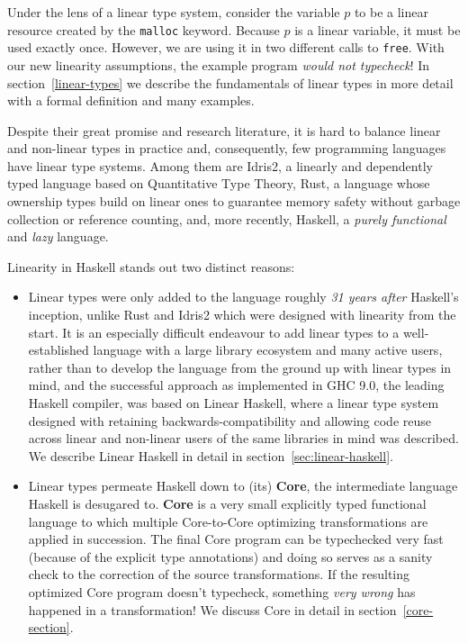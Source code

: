 \documentclass[]{lwnovathesis}
\begin{document}
Under the lens of a linear type system, consider the variable $p$ to be a linear
resource created by the \texttt{malloc} keyword. Because $p$ is a linear
variable, it must be used exactly once. However, we are using it in two
different calls to \texttt{free}. With our new linearity assumptions, the
example program \emph{would not typecheck}!  In section~\ref{linear-types} we describe the fundamentals of linear
types in more detail with a formal definition and many examples.

Despite their great promise and research literature, it is hard to balance
linear and non-linear types in practice and, consequently, few programming
languages have linear type systems. Among them are Idris2\cite{}, a linearly and
dependently typed language based on Quantitative Type Theory, Rust\cite{}, a
language whose ownership types build on linear ones to guarantee memory safety
without garbage collection or reference counting, and, more recently,
Haskell\cite{}, a \emph{purely functional} and \emph{lazy} language.

Linearity in Haskell stands out %
two distinct reasons:

\begin{itemize}
    \item Linear types were only added to the language roughly \emph{31 years
        after} Haskell's inception, unlike Rust and Idris2 which were
        designed with linearity from the start. It is an especially difficult
        endeavour to add linear types to a well-established language with a
        large library ecosystem and many active users, rather than to develop
        the language from the ground up with linear types in mind, and the
        successful approach as implemented in GHC 9.0, the leading Haskell
        compiler, was based on Linear Haskell\cite{cite:linearhaskell}, where a
        linear type system designed with retaining backwards-compatibility and
        allowing code reuse across linear and non-linear users of the same
        libraries in mind was described. We describe Linear Haskell in detail in
        section~\ref{sec:linear-haskell}.

    \item Linear types permeate Haskell down to (its) \textbf{Core}, the
        intermediate language Haskell is desugared to. \textbf{Core} is a very
        small explicitly typed functional language to which multiple
        Core-to-Core optimizing transformations are applied in succession. The
        final Core program can be typechecked very fast (because of the explicit
        type annotations) and doing so serves as a sanity check to the
        correction of the source transformations. If the resulting optimized
        Core program doesn't typecheck, something \emph{very wrong} has happened
        in a transformation!  We discuss Core in detail in
        section~\ref{core-section}.
\end{itemize}
\end{document}
